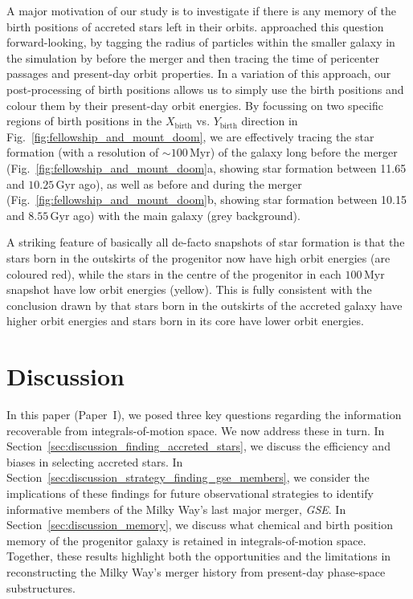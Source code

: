 \documentclass[fleqn,usenatbib]{mnras}
\begin{document}
A major motivation of our study is to investigate if there is any memory of the birth positions of accreted stars left in their orbits. \citet{Skuladottir2025} approached this question forward-looking, by tagging the radius of particles within the smaller galaxy in the simulation by \citet{Mori2024} before the merger and then tracing the time of pericenter passages and present-day orbit properties. In a variation of this approach, our post-processing of birth positions allows us to simply use the birth positions and colour them by their present-day orbit energies. By focussing on two specific regions of birth positions in the $X_\mathrm{birth}$ vs. $Y_\mathrm{birth}$ direction in Fig.~\ref{fig:fellowship_and_mount_doom}, we are effectively tracing the star formation (with a resolution of $\sim 100\,\mathrm{Myr}$) of the galaxy long before the merger (Fig.~\ref{fig:fellowship_and_mount_doom}a, showing star formation between 11.65 and $10.25\,\mathrm{Gyr}$ ago), as well as before and during the merger (Fig.~\ref{fig:fellowship_and_mount_doom}b, showing star formation between 10.15 and $8.55\,\mathrm{Gyr}$ ago) with the main galaxy (grey background).

A striking feature of basically all de-facto snapshots of star formation is that the stars born in the outskirts of the progenitor now have high orbit energies (are coloured red), while the stars in the centre of the progenitor in each $100\,\mathrm{Myr}$ snapshot have low orbit energies (yellow). This is fully consistent with the conclusion drawn by \citet{Skuladottir2025} that stars born in the outskirts of the accreted galaxy have higher orbit energies and stars born in its core have lower orbit energies.

\section{Discussion}
\label{sec:discussion}

In this paper (Paper~I), we posed three key questions regarding the information recoverable from integrals-of-motion space. We now address these in turn. In Section~\ref{sec:discussion_finding_accreted_stars}, we discuss the efficiency and biases in selecting accreted stars. In Section~\ref{sec:discussion_strategy_finding_gse_members}, we consider the implications of these findings for future observational strategies to identify informative members of the Milky Way’s last major merger, \textit{GSE}. In Section~\ref{sec:discussion_memory}, we discuss what chemical and birth position memory of the progenitor galaxy is retained in integrals-of-motion space. Together, these results highlight both the opportunities and the limitations in reconstructing the Milky Way’s merger history from present-day phase-space substructures.
\end{document}
